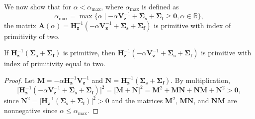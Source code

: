 We now show that for $\alpha < \alpha_{\text{max}}$, where $\alpha_{\text{max}}$ is defined as 
\begin{equation}
\alpha_{\text{max}} = \max \{ \alpha \mid -\alpha \mathbf{V}_{\mathbf{z}}^{-1} + \mathbf{\Sigma_{s}} + \mathbf{\Sigma_{f}} \geq \mathbf{0}, \alpha \in \mathbb{R} \},
\end{equation}
the matrix $\mathbf{A}(\alpha) = \mathbf{H}_{\mathbf{z}}^{-1}( -\alpha \mathbf{V}_{\mathbf{z}}^{-1} + \mathbf{\Sigma_{s}} + \mathbf{\Sigma_{f}} )$ is primitive with index of primitivity of two.
\begin{theorem}
	If $\mathbf{H}_{\mathbf{z}}^{-1}( \mathbf{\Sigma_{s}} + \mathbf{\Sigma_{f}} )$ is primitive, then $\mathbf{H}_{\mathbf{z}}^{-1}( -\alpha \mathbf{V}_{\mathbf{z}}^{-1} + \mathbf{\Sigma_{s}} + \mathbf{\Sigma_{f}} )$ is primitive with index of primitivity equal to two.
\end{theorem}
\begin{proof}
	Let $\mathbf{M} = -\alpha \mathbf{H}_{\mathbf{z}}^{-1} \mathbf{V}_{\mathbf{z}}^{-1}$ and $\mathbf{N} = \mathbf{H}_{\mathbf{z}}^{-1}( \mathbf{\Sigma_{s}} + \mathbf{\Sigma_{f}} )$. By multiplication,
	\begin{equation}
		\bigg [ \mathbf{H}_{\mathbf{z}}^{-1}( -\alpha \mathbf{V}_{\mathbf{z}}^{-1} + \mathbf{\Sigma_{s}} + \mathbf{\Sigma_{f}} ) \bigg ]^{2} = \bigg [ \mathbf{M} + \mathbf{N} \bigg ]^{2} = \mathbf{M}^{2} + \mathbf{MN} + \mathbf{NM} + \mathbf{N}^{2} > \mathbf{0},
	\end{equation}
	since $\mathbf{N}^{2} = \big [ \mathbf{H}_{\mathbf{z}}^{-1}( \mathbf{\Sigma_{s}} + \mathbf{\Sigma_{f}} ) \big ]^{2} > \mathbf{0}$ and the matrices $\mathbf{M}^{2}$, $\mathbf{MN}$, and $\mathbf{NM}$ are nonnegative since $\alpha \leq \alpha_{\text{max}}$.
\end{proof}

